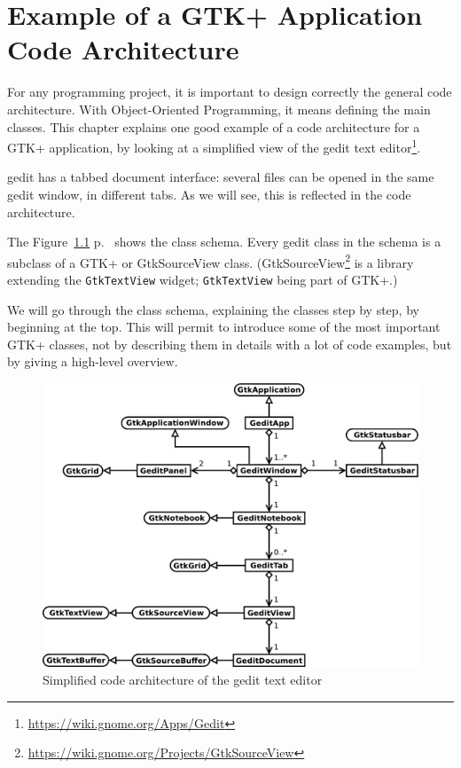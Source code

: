 \chapter{Example of a GTK+ Application Code Architecture}
\label{gtk-app-arch}


For any programming project, it is important to design correctly the general code architecture. With Object-Oriented Programming, it means defining the main classes. This chapter explains one good example of a code architecture for a GTK+ application, by looking at a simplified view of the gedit text editor\footnote{\url{https://wiki.gnome.org/Apps/Gedit}}.

gedit has a tabbed document interface: several files can be opened in the same gedit window, in different tabs. As we will see, this is reflected in the code architecture.

The Figure~\ref{fig:gedit-architecture} p.~\pageref{fig:gedit-architecture} shows the class schema. Every gedit class in the schema is a subclass of a GTK+ or GtkSourceView class. (GtkSourceView\footnote{\url{https://wiki.gnome.org/Projects/GtkSourceView}} is a library extending the \lstinline{GtkTextView} widget; \lstinline{GtkTextView} being part of GTK+.)

We will go through the class schema, explaining the classes step by step, by beginning at the top. This will permit to introduce some of the most important GTK+ classes, not by describing them in details with a lot of code examples, but by giving a high-level overview.

\begin{figure}
  \begin{center}
    \includegraphics[width=\textwidth]{images/gedit-architecture.pdf}
    \caption{Simplified code architecture of the gedit text editor}
    \label{fig:gedit-architecture}
  \end{center}
\end{figure}

